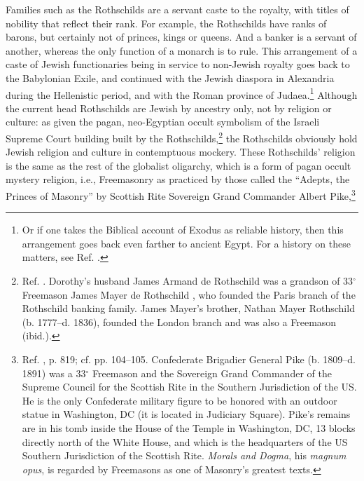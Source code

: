 \documentclass[letterpaper,12pt]{article}
\begin{document}
Families such as the Rothschilds are a servant caste to the royalty, with titles of nobility that reflect their rank. For example, the Rothschilds have ranks of barons, but certainly not of princes, kings or queens. And a banker is a servant of another, whereas the only function of a monarch is to rule. This arrangement of a caste of Jewish functionaries being in service to non-Jewish royalty goes back to the Babylonian Exile, and continued with the Jewish diaspora in Alexandria during the Hellenistic period, and with the Roman province of Judaea.\footnote{Or if one takes the Biblical account of Exodus as reliable history, then this arrangement goes back even farther to ancient Egypt. For a history on these matters, see Ref. .} Although the current head Rothschilds are Jewish by ancestry only, not by religion or culture: as given the pagan, neo-Egyptian occult symbolism of the Israeli Supreme Court building built by the Rothschilds,\footnote{Ref. . Dorothy's husband James Armand de Rothschild was a grandson of 33\( ^{\circ} \) Freemason James Mayer de Rothschild \cite{Denslow1957}, who founded the Paris branch of the Rothschild banking family. James Mayer's brother, Nathan Mayer Rothschild (b. 1777--d. 1836), founded the London branch and was also a Freemason (ibid.).} the Rothschilds obviously hold Jewish religion and culture in contemptuous mockery. These Rothschilds' religion is the same as the rest of the globalist oligarchy, which is a form of pagan occult mystery religion, i.e., Freemasonry as practiced by those called the ``Adepts, the Princes of Masonry'' by Scottish Rite Sovereign Grand Commander Albert Pike,\footnote{Ref. , p. 819; cf. pp. 104--105. Confederate Brigadier General Pike (b. 1809--d. 1891) was a 33\( ^{\circ} \) Freemason and the Sovereign Grand Commander of the Supreme Council for the Scottish Rite in the Southern Jurisdiction of the US. He is the only Confederate military figure to be honored with an outdoor statue in Washington, DC (it is located in Judiciary Square). Pike's remains are in his tomb inside the House of the Temple in Washington, DC, 13 blocks directly north of the White House, and which is the headquarters of the US Southern Jurisdiction of the Scottish Rite. \emph{Morals and Dogma}, his \emph{magnum opus}, is regarded by Freemasons as one of Masonry's greatest texts.\par
}
\end{document}
